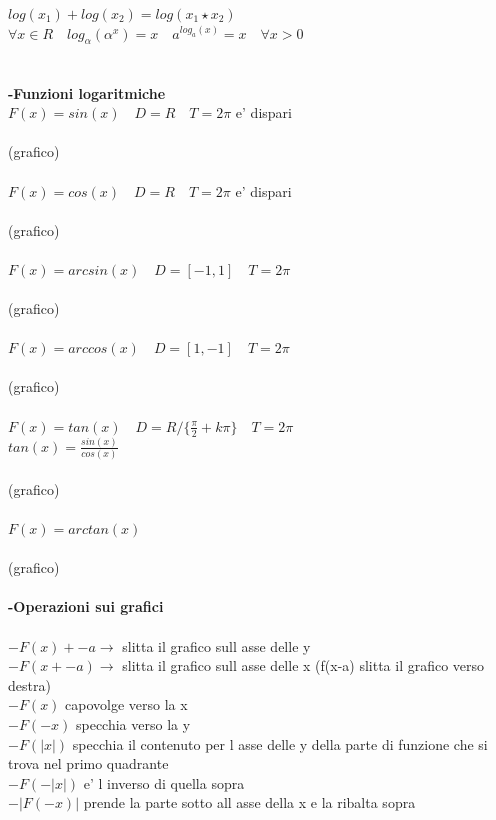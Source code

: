 \documentclass{article}
\begin{document}
$log(x_{1}) + log(x_{2})=log(x_{1} \star x_{2})$\\
$\forall x \in R \quad log_{\alpha}(\alpha^{x})=x \quad a^{log_{a}(x)}=x \quad \forall x>0$\\
\\
\\
\textbf{-Funzioni logaritmiche}\\
$F(x)=sin(x) \quad D=R \quad T=2 \pi$ e' dispari\\
\\
(grafico)
\\
\\
$F(x)=cos(x) \quad D=R \quad T=2 \pi$ e' dispari\\
\\
(grafico)\\
\\
$F(x)=arcsin(x) \quad D=[-1,1] \quad T=2 \pi$\\
\\
(grafico)
\\
\\
$F(x)=arccos(x) \quad D=[1,-1] \quad T=2 \pi$\\
\\
(grafico)
\\
\\
$F(x)=tan(x) \quad D= R/\{\frac{\pi}{2}+k \pi \} \quad T=2 \pi$\\
$tan(x)=\frac{sin(x)}{cos(x)}$\\
\\
(grafico)
\\
\\
$F(x)=arctan(x)$\\
\\
(grafico)
\\
\\
\textbf{-Operazioni sui grafici}\\
\\
$-F(x)+-a \to$ slitta il grafico sull asse delle y\\
$-F(x+-a) \to$ slitta il grafico sull asse delle x (f(x-a) slitta il grafico verso destra)\\
$-F(x)$ capovolge verso la x\\
$-F(-x)$ specchia verso la y\\
$-F(|x|)$ specchia il contenuto  per l asse delle y della parte di funzione che si trova nel primo quadrante\\
$-F(- |x|)$ e' l inverso di quella sopra\\
$- |F(-x)|$ prende la parte sotto all asse della x e la ribalta sopra\\
\end{document}
